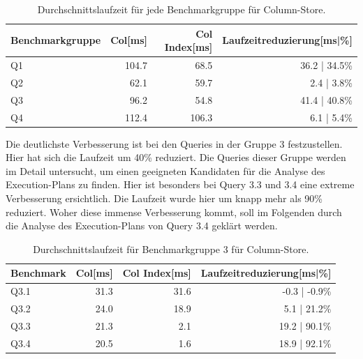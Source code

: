 \begin{table}[!ht]
    \centering
    \begin{tabularx}{14cm}{lrrr}
        \toprule
        Benchmarkgruppe & Col[ms]   & Col Index[ms] & Laufzeitreduzierung[ms|\%]\\
        \toprule
        Q1              & 104.7       & 68.5            & 36.2 | 34.5\%\\
        Q2              & 62.1        & 59.7            & 2.4  | 3.8\%\\
        Q3              & 96.2        & 54.8            & 41.4 | 40.8\%\\
        Q4              & 112.4       & 106.3           & 6.1  | 5.4\%\\
        \bottomrule
    \end{tabularx}
\caption{Durchschnittslaufzeit für jede Benchmarkgruppe für Column-Store.}
\end{table}

Die deutlichste Verbesserung ist bei den Queries in der Gruppe 3 festzustellen. Hier hat sich die Laufzeit um 40\% reduziert. Die Queries dieser Gruppe werden im Detail untersucht, um einen geeigneten Kandidaten für die Analyse des Execution-Plans zu finden.
Hier ist besonders bei Query 3.3 und 3.4 eine extreme Verbesserung ersichtlich. Die Laufzeit wurde hier um knapp mehr als 90\% reduziert. Woher diese immense Verbesserung kommt, soll im Folgenden durch die Analyse des Execution-Plans von Query 3.4 geklärt werden.


\begin{table}[!ht]
    \centering
    \begin{tabularx}{13cm}{lrrr}
        \toprule
        Benchmark           & Col[ms]       & Col Index[ms] & Laufzeitreduzierung[ms|\%]   \\
        \toprule
        Q3.1                & 31.3          & 31.6          & -0.3 | -0.9\%                \\
        Q3.2                & 24.0          & 18.9          & 5.1 | 21.2\%                 \\
        Q3.3                & 21.3          & 2.1           & 19.2 | 90.1\%                \\
        Q3.4                & 20.5          & 1.6           & 18.9 | 92.1\%                \\
        \bottomrule
    \end{tabularx}
\caption{Durchschnittslaufzeit für Benchmarkgruppe 3 für Column-Store.}
\end{table}

